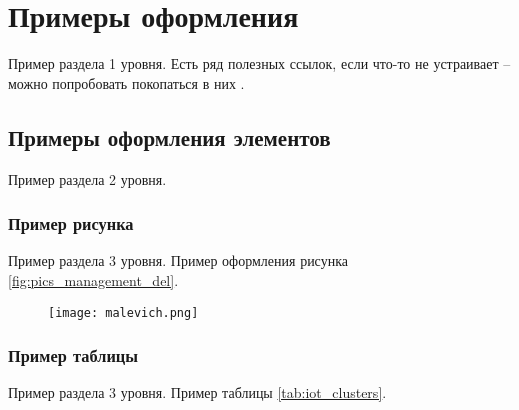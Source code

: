 \documentclass[../main]{subfiles}
\begin{document}
\newpage
\section{Примеры оформления}
\label{sec:subject_domain}

Пример раздела 1 уровня. Есть ряд полезных ссылок, если что-то не устраивает -- можно попробовать покопаться в них \cite{gost-docs, gost-repo, gost-examples, master-report-repo}.

\subsection{Примеры оформления элементов}
Пример раздела 2 уровня.

\subsubsection{Пример рисунка}
Пример раздела 3 уровня. Пример оформления рисунка \ref{fig:pics_management_del}.

\begin{figure}[H]
    \centering
    {\texttt{[image: malevich.png]}}
    \vspace{-\baselineskip}
\end{figure}

\subsubsection{Пример таблицы}
Пример раздела 3 уровня. Пример таблицы \ref{tab:iot_clusters}.
\end{document}
